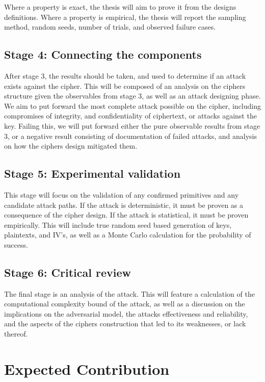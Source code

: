 \documentclass[11pt]{article}
\begin{document}
Where a property is exact, the thesis will aim to prove it from the designs definitions. Where a property is empirical, the thesis will report the sampling method, random seeds, number of trials, and observed failure cases.

\subsection{Stage 4: Connecting the components}

After stage 3, the results should be taken, and used to determine if an attack exists against the cipher. This will be composed of an analysis on the ciphers structure given the observables from stage 3, as well as an attack designing phase.\\

We aim to put forward the most complete attack possible on the cipher, including compromises of integrity, and confidentiality of ciphertext, or attacks against the key. Failing this, we will put forward either the pure observable results from stage 3, or a negative result consisting of documentation of failed attacks, and analysis on how the ciphers design mitigated them.


\subsection{Stage 5: Experimental validation}

This stage will focus on the validation of any confirmed primitives and any candidate attack paths. If the attack is deterministic, it must be proven as a consequence of the cipher design. If the attack is statistical, it must be proven empirically. This will include true random seed based generation of keys, plaintexts, and IV's, as well as a Monte Carlo calculation for the probability of success.

\subsection{Stage 6: Critical review}

The final stage is an analysis of the attack. This will feature a calculation of the computational complexity bound of the attack, as well as a discussion on the implications on the adversarial model, the attacks effectiveness and reliability, and the aspects of the ciphers construction that led to its weaknesses, or lack thereof.

\section{Expected Contribution}
\end{document}
